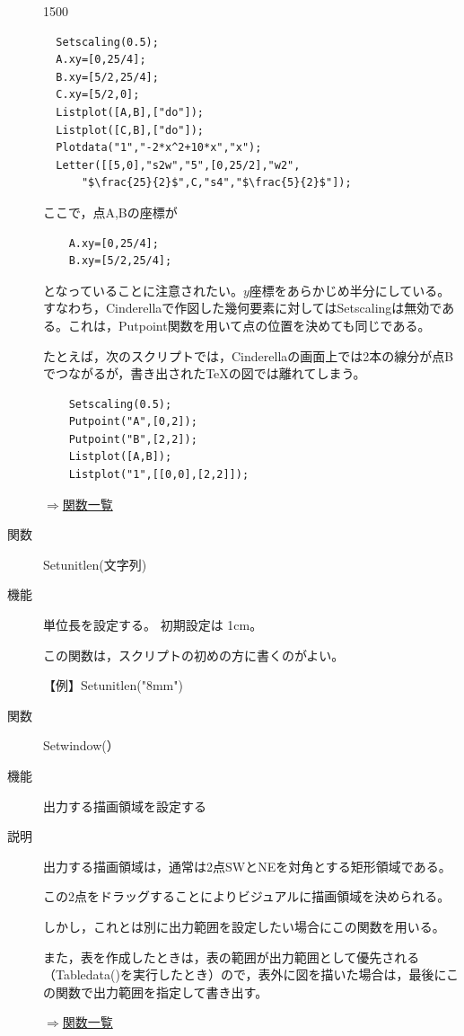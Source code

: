 \documentclass[papersize,a4paper,12pt,uplatex]{jsarticle}
\begin{document}
\begin{description}
\begin{layer}{150}{0}
\end{layer}
\begin{verbatim}
  Setscaling(0.5);
  A.xy=[0,25/4];
  B.xy=[5/2,25/4];
  C.xy=[5/2,0];
  Listplot([A,B],["do"]);
  Listplot([C,B],["do"]);
  Plotdata("1","-2*x^2+10*x","x");
  Letter([[5,0],"s2w","5",[0,25/2],"w2",
      "$\frac{25}{2}$",C,"s4","$\frac{5}{2}$"]);
\end{verbatim}
  ここで，点A,Bの座標が
\begin{verbatim}
    A.xy=[0,25/4];
    B.xy=[5/2,25/4];
\end{verbatim}
となっていることに注意されたい。$y$座標をあらかじめ半分にしている。すなわち，Cinderellaで作図した幾何要素に対してはSetscalingは無効である。これは，Putpoint関数を用いて点の位置を決めても同じである。

たとえば，次のスクリプトでは，Cinderellaの画面上では2本の線分が点Bでつながるが，書き出された\TeX の図では離れてしまう。
\begin{verbatim}
    Setscaling(0.5);
    Putpoint("A",[0,2]);
    Putpoint("B",[2,2]);
    Listplot([A,B]);
    Listplot("1",[[0,0],[2,2]]);
\end{verbatim}

\begin{flushright}  \hyperlink{functionlist}{$\Rightarrow$関数一覧}\end{flushright}

\vspace{\baselineskip}
\hypertarget{setunitlen}{}
\item[関数]  Setunitlen(文字列)
\item[機能]  単位長を設定する。 初期設定は 1cm。

この関数は，スクリプトの初めの方に書くのがよい。
  
【例】Setunitlen("8mm")
  
\vspace{\baselineskip}
\hypertarget{setwindow}{}
\item[関数]  Setwindow(）
\item[機能]  出力する描画領域を設定する
\item[説明]  出力する描画領域は，通常は2点SWとNEを対角とする矩形領域である。

この2点をドラッグすることによりビジュアルに描画領域を決められる。

しかし，これとは別に出力範囲を設定したい場合にこの関数を用いる。

また，表を作成したときは，表の範囲が出力範囲として優先される（Tabledata()を実行したとき）ので，表外に図を描いた場合は，最後にこの関数で出力範囲を指定して書き出す。

\begin{flushright}  \hyperlink{functionlist}{$\Rightarrow$関数一覧}\end{flushright}

\end{description}
\end{document}
